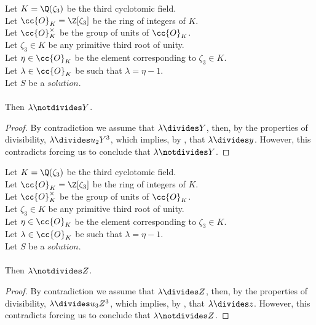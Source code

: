 \begin{lemma}
  \label{lmm:lambda_not_dvd_Y}
  \leanok
  Let $K = \Q(\zeta_3)$ be the third cyclotomic field. \\
  Let $\cc{O}_K = \Z[\zeta_3]$ be the ring of integers of $K$. \\
  Let $\cc{O}^\times_K$ be the group of units of $\cc{O}_K$. \\
  Let $\zeta_3 \in K$ be any primitive third root of unity. \\
  Let $\eta \in \cc{O}_K$ be the element corresponding to $\zeta_3 \in K$. \\
  Let $\lambda \in \cc{O}_K$ be such that $\lambda = \eta -1$. \\
  Let $S$ be a $solution$.\\\\
  Then $\lambda \notdivides Y$.
\end{lemma}
\begin{proof}
  \leanok
  By contradiction we assume that $\lambda \divides Y$, then, by the properties of divisibility,
  $\lambda \divides u_2 Y^3$, which implies, by ,
  that $\lambda \divides y$.
  However, this contradicts 
  forcing us to conclude that $\lambda \notdivides Y$.
\end{proof}

\begin{lemma}
  \label{lmm:lambda_not_dvd_Z}
  \leanok
  Let $K = \Q(\zeta_3)$ be the third cyclotomic field. \\
  Let $\cc{O}_K = \Z[\zeta_3]$ be the ring of integers of $K$. \\
  Let $\cc{O}^\times_K$ be the group of units of $\cc{O}_K$. \\
  Let $\zeta_3 \in K$ be any primitive third root of unity. \\
  Let $\eta \in \cc{O}_K$ be the element corresponding to $\zeta_3 \in K$. \\
  Let $\lambda \in \cc{O}_K$ be such that $\lambda = \eta -1$. \\
  Let $S$ be a $solution$.\\\\
  Then $\lambda \notdivides Z$.
\end{lemma}
\begin{proof}
  \leanok
  By contradiction we assume that $\lambda \divides Z$, then, by the properties of divisibility,
  $\lambda \divides u_3 Z^3$, which implies, by ,
  that $\lambda \divides z$.
  However, this contradicts 
  forcing us to conclude that $\lambda \notdivides Z$.
\end{proof}

